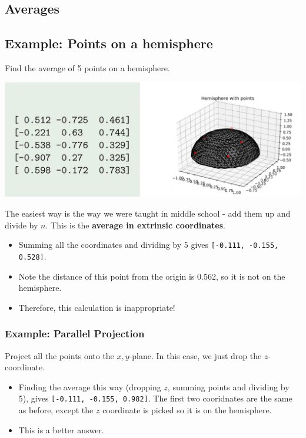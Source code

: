 \documentclass[10pt]{article}
\begin{document}
\subsection*{Averages}
\subsection*{Example: Points on a hemisphere}
Find the average of 5 points on a hemisphere.
\begin{center}
    \includegraphics*[width=\textwidth]{W4_6.png}
\end{center}
The easiest way is the way we were taught in middle school - add them up and divide by $n$.  This is the \textbf{average in extrinsic coordinates}.
\begin{itemize}
    \item Summing all the coordinates and dividing by 5 gives \texttt{[-0.111, -0.155, 0.528]}.
    \item Note the distance of this point from the origin is 0.562, so it is not on the hemisphere.
    \item Therefore, this calculation is inappropriate!
\end{itemize}
\subsubsection*{Example: Parallel Projection}
Project all the points onto the $x, y$-plane.  In this case, we just drop the $z$-coordinate.
\begin{itemize}
    \item Finding the average this way (dropping $z$, summing points and dividing by 5), gives \texttt{[-0.111, -0.155, 0.982]}.  The first two cooridnates are the same as before, except the $z$ coordinate is picked so it is on the hemisphere.
    \item This is a better answer.
\end{itemize}
\end{document}
